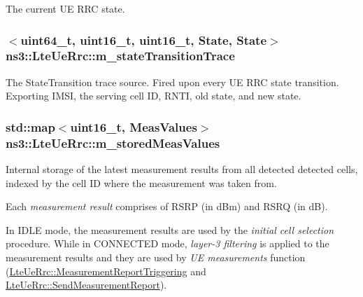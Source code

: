 The current UE R\+RC state. 

\subsubsection[{\texorpdfstring{m\+\_\+state\+Transition\+Trace}{m_stateTransitionTrace}}]{$<$uint64\+\_\+t, uint16\+\_\+t, uint16\+\_\+t, {\bf State}, {\bf State}$>$ ns3\+::\+Lte\+Ue\+Rrc\+::m\+\_\+state\+Transition\+Trace\hspace{0.3cm}{\ttfamily [private]}}\hypertarget{classns3_1_1LteUeRrc_a269fed2358610ca08549e8d1f211623b}{}\label{classns3_1_1LteUeRrc_a269fed2358610ca08549e8d1f211623b}
The {\ttfamily State\+Transition} trace source. Fired upon every UE R\+RC state transition. Exporting I\+M\+SI, the serving cell ID, R\+N\+TI, old state, and new state. 
\subsubsection[{\texorpdfstring{m\+\_\+stored\+Meas\+Values}{m_storedMeasValues}}]{\setlength{\rightskip}{0pt plus 5cm}std\+::map$<$uint16\+\_\+t, {\bf Meas\+Values}$>$ ns3\+::\+Lte\+Ue\+Rrc\+::m\+\_\+stored\+Meas\+Values\hspace{0.3cm}{\ttfamily [private]}}\hypertarget{classns3_1_1LteUeRrc_a93094dcd5c235b2e2a8a299125100a57}{}\label{classns3_1_1LteUeRrc_a93094dcd5c235b2e2a8a299125100a57}


Internal storage of the latest measurement results from all detected detected cells, indexed by the cell ID where the measurement was taken from. 

Each {\itshape measurement result} comprises of R\+S\+RP (in d\+Bm) and R\+S\+RQ (in dB).

In I\+D\+LE mode, the measurement results are used by the {\itshape initial cell selection} procedure. While in C\+O\+N\+N\+E\+C\+T\+ED mode, {\itshape layer-\/3 filtering} is applied to the measurement results and they are used by {\itshape UE measurements} function (\hyperlink{classns3_1_1LteUeRrc_a992083d5b0928a7a88882bede99afd2b}{Lte\+Ue\+Rrc\+::\+Measurement\+Report\+Triggering} and \hyperlink{classns3_1_1LteUeRrc_a053ea56e705de39c3531ec0a393c084d}{Lte\+Ue\+Rrc\+::\+Send\+Measurement\+Report}). 
